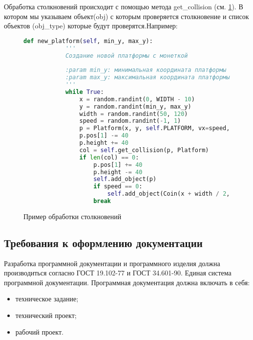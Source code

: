 Обработка столкновений происходит с помощью метода get\_collision (см. \ref{GetCol:imgage}). В котором мы указываем объект(obj) с которым проверяется столкновение и список объектов (obj\_type) которые будут проверятся.Например:

\begin{figure}[H]
	\begin{lstlisting}[language=Python]
		def new_platform(self, min_y, max_y):
			'''
			Создание новой платформы с монеткой
			
			:param min_y: минимальная координата платформы
			:param max_y: максимальная координата платформы
			'''
			while True:
				x = random.randint(0, WIDTH - 10)
				y = random.randint(min_y, max_y)
				width = random.randint(50, 120)
				speed = random.randint(-1, 1)
				p = Platform(x, y, self.PLATFORM, vx=speed, width=width)
				p.pos[1] -= 40
				p.height += 40
				col = self.get_collision(p, Platform)
				if len(col) == 0:
					p.pos[1] += 40
					p.height -= 40
					self.add_object(p)
					if speed == 0:
						self.add_object(Coin(x + width / 2, y - 50, self.COIN))
					break
	\end{lstlisting}
	\caption{Пример обработки столкновений}
	\label{GetCol:imgage}
\end{figure}

\subsection{Требования к оформлению документации}

Разработка программной документации и программного изделия должна производиться согласно ГОСТ 19.102-77 и ГОСТ 34.601-90. Единая система программной документации.
Программная документация должна включать в себя:
\begin{itemize}
	\item техническое задание;
	\item технический проект;
	\item рабочий проект.
\end{itemize}